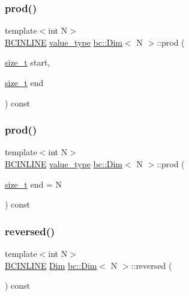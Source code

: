 \subsubsection{\texorpdfstring{prod()}{prod()}\hspace{0.1cm}{\footnotesize\ttfamily [1/2]}}
{\footnotesize\ttfamily template$<$int N$>$ \\
\hyperlink{common_8h_a6699e8b0449da5c0fafb878e59c1d4b1}{B\+C\+I\+N\+L\+I\+NE} \hyperlink{structbc_1_1Dim_af59ff554825273cf6bd9619b2c78c196}{value\+\_\+type} \hyperlink{structbc_1_1Dim}{bc\+::\+Dim}$<$ N $>$\+::prod (\begin{DoxyParamCaption}\item[{\hyperlink{structbc_1_1Dim_a8c7c7ae0cd96c3923e76097089747290}{size\+\_\+t}}]{start,  }\item[{\hyperlink{structbc_1_1Dim_a8c7c7ae0cd96c3923e76097089747290}{size\+\_\+t}}]{end }\end{DoxyParamCaption}) const\hspace{0.3cm}{\ttfamily [inline]}}

\mbox{\label{structbc_1_1Dim_a58b06a4867efa038e0f08cc43d154123}} 
\subsubsection{\texorpdfstring{prod()}{prod()}\hspace{0.1cm}{\footnotesize\ttfamily [2/2]}}
{\footnotesize\ttfamily template$<$int N$>$ \\
\hyperlink{common_8h_a6699e8b0449da5c0fafb878e59c1d4b1}{B\+C\+I\+N\+L\+I\+NE} \hyperlink{structbc_1_1Dim_af59ff554825273cf6bd9619b2c78c196}{value\+\_\+type} \hyperlink{structbc_1_1Dim}{bc\+::\+Dim}$<$ N $>$\+::prod (\begin{DoxyParamCaption}\item[{\hyperlink{structbc_1_1Dim_a8c7c7ae0cd96c3923e76097089747290}{size\+\_\+t}}]{end = {\ttfamily N} }\end{DoxyParamCaption}) const\hspace{0.3cm}{\ttfamily [inline]}}

\mbox{\label{structbc_1_1Dim_aab0559a558d0b7188beb2f8c811f150d}} 
\subsubsection{\texorpdfstring{reversed()}{reversed()}}
{\footnotesize\ttfamily template$<$int N$>$ \\
\hyperlink{common_8h_a6699e8b0449da5c0fafb878e59c1d4b1}{B\+C\+I\+N\+L\+I\+NE} \hyperlink{structbc_1_1Dim}{Dim} \hyperlink{structbc_1_1Dim}{bc\+::\+Dim}$<$ N $>$\+::reversed (\begin{DoxyParamCaption}{ }\end{DoxyParamCaption}) const\hspace{0.3cm}{\ttfamily [inline]}}

